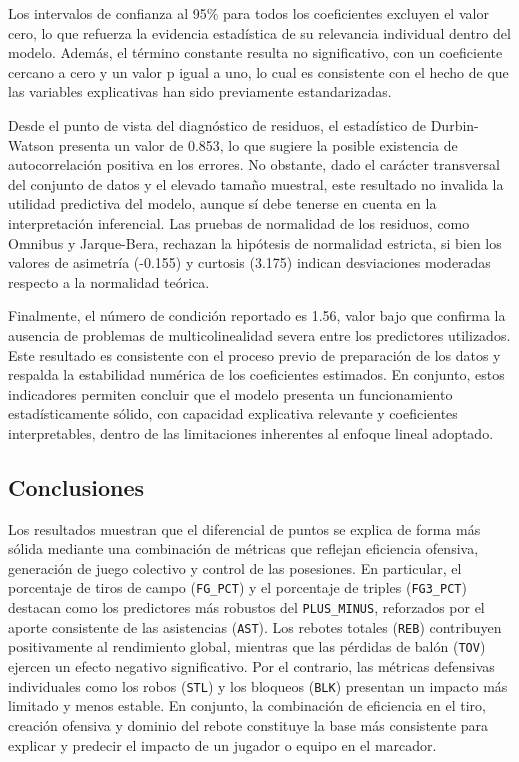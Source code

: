 \documentclass[12pt]{article}
\begin{document}
Los intervalos de confianza al 95\% para todos los coeficientes excluyen el valor cero, lo que refuerza la evidencia estadística de su relevancia individual dentro del modelo. Además, el término constante resulta no significativo, con un coeficiente cercano a cero y un valor p igual a uno, lo cual es consistente con el hecho de que las variables explicativas han sido previamente estandarizadas.

Desde el punto de vista del diagnóstico de residuos, el estadístico de Durbin-Watson presenta un valor de 0.853, lo que sugiere la posible existencia de autocorrelación positiva en los errores. No obstante, dado el carácter transversal del conjunto de datos y el elevado tamaño muestral, este resultado no invalida la utilidad predictiva del modelo, aunque sí debe tenerse en cuenta en la interpretación inferencial. Las pruebas de normalidad de los residuos, como Omnibus y Jarque-Bera, rechazan la hipótesis de normalidad estricta, si bien los valores de asimetría (-0.155) y curtosis (3.175) indican desviaciones moderadas respecto a la normalidad teórica.

Finalmente, el número de condición reportado es 1.56, valor bajo que confirma la ausencia de problemas de multicolinealidad severa entre los predictores utilizados. Este resultado es consistente con el proceso previo de preparación de los datos y respalda la estabilidad numérica de los coeficientes estimados. En conjunto, estos indicadores permiten concluir que el modelo presenta un funcionamiento estadísticamente sólido, con capacidad explicativa relevante y coeficientes interpretables, dentro de las limitaciones inherentes al enfoque lineal adoptado.

\subsection{Conclusiones}

Los resultados muestran que el diferencial de puntos se explica de forma más sólida mediante una combinación de métricas que reflejan eficiencia ofensiva, generación de juego colectivo y control de las posesiones. En particular, el porcentaje de tiros de campo (\texttt{FG\_PCT}) y el porcentaje de triples (\texttt{FG3\_PCT}) destacan como los predictores más robustos del \texttt{PLUS\_MINUS}, reforzados por el aporte consistente de las asistencias (\texttt{AST}). Los rebotes totales (\texttt{REB}) contribuyen positivamente al rendimiento global, mientras que las pérdidas de balón (\texttt{TOV}) ejercen un efecto negativo significativo. Por el contrario, las métricas defensivas individuales como los robos (\texttt{STL}) y los bloqueos (\texttt{BLK}) presentan un impacto más limitado y menos estable. En conjunto, la combinación de eficiencia en el tiro, creación ofensiva y dominio del rebote constituye la base más consistente para explicar y predecir el impacto de un jugador o equipo en el marcador.
\end{document}
